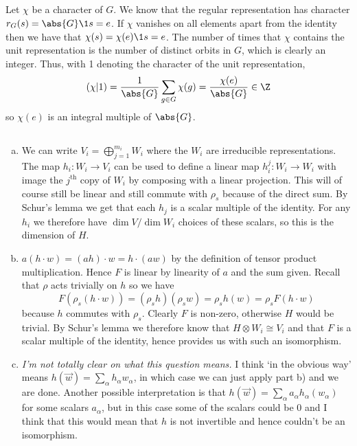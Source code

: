 \documentclass[a4paper, oneside, 10pt]{article}
\numberwithin{Answer}{section}
\numberwithin{Exercise}{section}
\begin{document}
\subsection{}
Let $\chi$ be a character of $G$. 
We know that the regular representation has character $r_G(s) = \abs{G}\1{s=e}$.
If $\chi$ vanishes on all elements apart from the identity then we have that $\chi(s) = \chi(e) \1{s=e}$.
The number of times that $\chi$ contains the unit representation is the number of distinct orbits in $G$,
which is clearly an integer. Thus, with 1 denoting the character of the unit representation,
\[
    (\chi|1) = \frac1{\abs{G}} \sum_{g \in G} \chi(g) = \frac{\chi(e)}{\abs{G}} \in \Z
\]
so $\chi(e)$ is an integral multiple of $\abs{G}$.

\subsection{}\label{ex:2.8}
\begin{enumerate}[a)]
    \item We can write $V_i = \bigoplus_{j=1}^{m_i} W_i$ where the $W_i$ are irreducible representations.
        The map $h_i : W_i \to V_i$ can be used to define a linear map $h_i^j: W_i \to W_i$ with image the 
        $j^{\text{th}}$ copy of $W_i$ by composing with a linear projection. This will of course still be linear
        and still commute with $\rho_s$ because of the direct sum. By Schur's lemma we get that each $h_j$ is a scalar
        multiple of the identity. For any $h_i$ we therefore have $\dim V / \dim W_i$ choices of these scalars,
        so this is the dimension of $H$.
    \item $a(h \cdot w) = (ah)\cdot w = h \cdot (aw)$ by the definition of
        tensor product multiplication. Hence $F$ is linear by linearity of $a$ and the sum
        given.
        Recall that $\rho$ acts trivially on $h$ so we have 
        \[
            F( \rho_s (h \cdot w)) = (\rho_s h) (\rho_s w) = \rho_s h (w) = \rho_s F (h \cdot w)
        \]
        because $h$ commutes with $\rho_s$.
        Clearly $F$ is non-zero, otherwise $H$ would be trivial. By Schur's lemma we therefore know that
        $H\otimes W_i \cong V_i$ and that $F$ is a scalar multiple of the identity, hence provides us with
        such an isomorphism.
    \item \emph{I'm not totally clear on what this question means.} I think `in the obvious way' means
        $h(\vec{w}) = \sum_\alpha h_\alpha w_\alpha$, in which case we can just apply part b) and we are done.
        Another possible interpretation is that $h(\vec{w}) = \sum_{\alpha} a_\alpha h_\alpha (w_\alpha)$ for some
        scalars $a_\alpha$, but in this case some of the scalars could be $0$ and I think that this would
        mean that $h$ is not invertible and hence couldn't be an isomorphism.
\end{enumerate}
\end{document}

